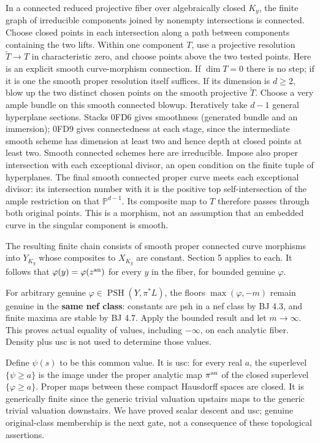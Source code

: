 \documentclass[
  10pt,
]{article}
\begin{document}
In a connected reduced projective fiber over algebraically closed
\(K_y\), the finite graph of irreducible components joined by nonempty
intersections is connected. Choose closed points in each intersection
along a path between components containing the two lifts. Within one
component \(T\), use a projective resolution \(\widetilde T\to T\) in
characteristic zero, and choose points above the two tested points. Here
is an explicit smooth curve-morphism connection. If \(\dim T=0\) there
is no step; if it is one the smooth proper resolution itself suffices.
If its dimension is \(d\ge2\), blow up the two distinct chosen points on
the smooth projective \(\widetilde T\). Choose a very ample bundle on
this smooth connected blowup. Iteratively take \(d-1\) general
hyperplane sections. Stacks 0FD6 gives smoothness (generated bundle and
an immersion); 0FD9 gives connectedness at each stage, since the
intermediate smooth scheme has dimension at least two and hence depth at
closed points at least two. Smooth connected schemes here are
irreducible. Impose also proper intersection with each exceptional
divisor, an open condition on the finite tuple of hyperplanes. The final
smooth connected proper curve meets each exceptional divisor: its
intersection number with it is the positive top self-intersection of the
ample restriction on that \(\mathbb P^{d-1}\). Its composite map to
\(T\) therefore passes through both original points. This is a morphism,
not an assumption that an embedded curve in the singular component is
smooth.

The resulting finite chain consists of smooth proper connected curve
morphisms into \(Y_{K_y}\) whose composites to \(X_{K_y}\) are constant.
Section 5 applies to each. It follows that
\(\varphi(y)=\varphi(z^{\rm an})\) for every \(y\) in the fiber, for
bounded genuine \(\varphi\).

For arbitrary genuine \(\varphi\in\operatorname{PSH}(Y,\pi^*L)\), the
floors \(\max(\varphi,-m)\) remain genuine in the \textbf{same nef
class}: constants are psh in a nef class by BJ 4.3, and finite maxima
are stable by BJ 4.7. Apply the bounded result and let \(m\to\infty\).
This proves actual equality of values, including \(-\infty\), on each
analytic fiber. Density plus usc is not used to determine those values.

Define \(\psi(s)\) to be this common value. It is usc: for every real
\(a\), the superlevel \(\{\psi\ge a\}\) is the image under the proper
analytic map \(\pi^{\rm an}\) of the closed superlevel
\(\{\varphi\ge a\}\). Proper maps between these compact Hausdorff spaces
are closed. It is generically finite since the generic trivial valuation
upstairs maps to the generic trivial valuation downstairs. We have
proved scalar descent and usc; genuine original-class membership is the
next gate, not a consequence of these topological assertions.
\end{document}

